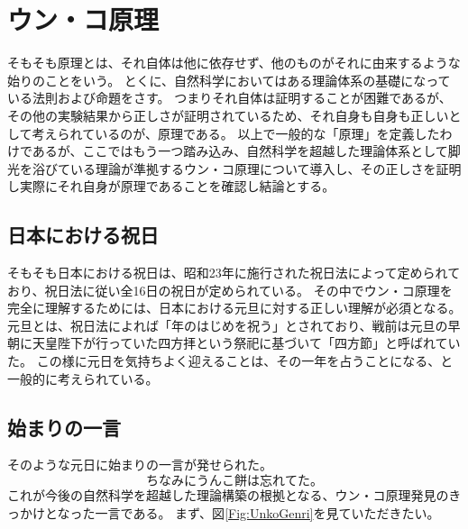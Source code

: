 \chapter{ウン・コ原理}
そもそも原理とは、それ自体は他に依存せず、他のものがそれに由来するような始りのことをいう。
とくに、自然科学においてはある理論体系の基礎になっている法則および命題をさす。
つまりそれ自体は証明することが困難であるが、その他の実験結果から正しさが証明されているため、それ自身も自身も正しいとして考えられているのが、原理である。
以上で一般的な「原理」を定義したわけであるが、ここではもう一つ踏み込み、自然科学を超越した理論体系として脚光を浴びている理論が準拠するウン・コ原理について導入し、その正しさを証明し実際にそれ自身が原理であることを確認し結論とする。

\section{日本における祝日}
そもそも日本における祝日は、昭和23年に施行された祝日法によって定められており、祝日法に従い全16日の祝日が定められている。
その中でウン・コ原理を完全に理解するためには、日本における元旦に対する正しい理解が必須となる。
元旦とは、祝日法によれば「年のはじめを祝う」とされており、戦前は元旦の早朝に天皇陛下が行っていた四方拝という祭祀に基づいて「四方節」と呼ばれていた。
この様に元日を気持ちよく迎えることは、その一年を占うことになる、と一般的に考えられている。

\section{始まりの一言}
そのような元日に始まりの一言が発せられた。
\[
ちなみにうんこ餅は忘れてた。
\]
これが今後の自然科学を超越した理論構築の根拠となる、ウン・コ原理発見のきっかけとなった一言である。
まず、図\ref{Fig:UnkoGenri}を見ていただきたい。


